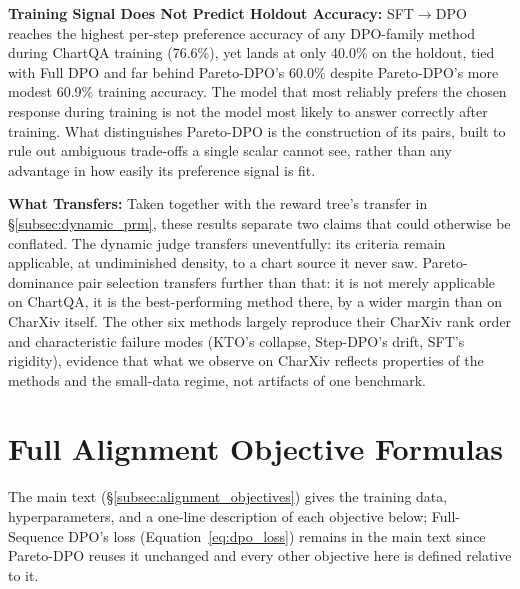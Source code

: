 \documentclass[11pt]{article}
\begin{document}
\textbf{Training Signal Does Not Predict Holdout Accuracy:} SFT$\rightarrow$DPO reaches the highest per-step preference accuracy of any DPO-family method during ChartQA training (76.6\%), yet lands at only 40.0\% on the holdout, tied with Full DPO and far behind Pareto-DPO's 60.0\% despite Pareto-DPO's more modest 60.9\% training accuracy. The model that most reliably prefers the chosen response during training is not the model most likely to answer correctly after training. What distinguishes Pareto-DPO is the construction of its pairs, built to rule out ambiguous trade-offs a single scalar cannot see, rather than any advantage in how easily its preference signal is fit.

\textbf{What Transfers:} Taken together with the reward tree's transfer in \S\ref{subsec:dynamic_prm}, these results separate two claims that could otherwise be conflated. The dynamic judge transfers uneventfully: its criteria remain applicable, at undiminished density, to a chart source it never saw. Pareto-dominance pair selection transfers further than that: it is not merely applicable on ChartQA, it is the best-performing method there, by a wider margin than on CharXiv itself. The other six methods largely reproduce their CharXiv rank order and characteristic failure modes (KTO's collapse, Step-DPO's drift, SFT's rigidity), evidence that what we observe on CharXiv reflects properties of the methods and the small-data regime, not artifacts of one benchmark.


\clearpage
\nocite{*}


\clearpage
\appendix
\renewcommand{\thesection}{Appendix \Alph{section}}
\section{Full Alignment Objective Formulas}
\label{sec:appendix_objectives}

The main text (\S\ref{subsec:alignment_objectives}) gives the training data, hyperparameters, and a one-line description of each objective below; Full-Sequence DPO's loss (Equation~\ref{eq:dpo_loss}) remains in the main text since Pareto-DPO reuses it unchanged and every other objective here is defined relative to it.
\end{document}
